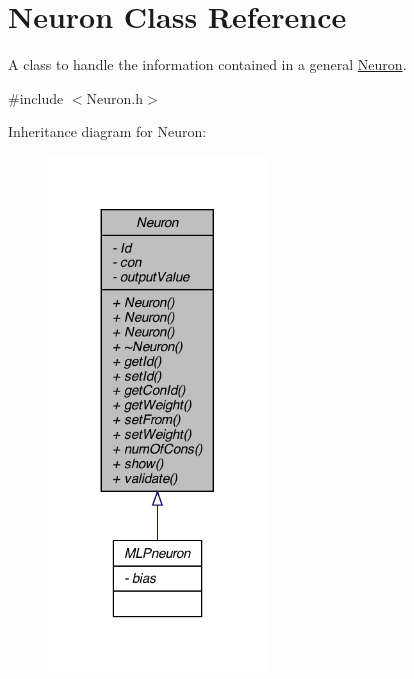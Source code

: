 \hypertarget{class_neuron}{
\section{Neuron Class Reference}
\label{class_neuron}
}


A class to handle the information contained in a general \hyperlink{class_neuron}{Neuron}.  




{\ttfamily \#include $<$Neuron.h$>$}



Inheritance diagram for Neuron:\nopagebreak
\begin{figure}[H]
\begin{center}
\leavevmode
\includegraphics[width=164pt]{class_neuron__inherit__graph}
\end{center}
\end{figure}


